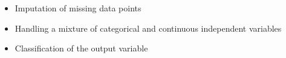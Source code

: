 \begin{itemize}
\item Imputation of missing data points
\item Handling a mixture of categorical and continuous independent variables
\item Classification of the output variable
\end{itemize}